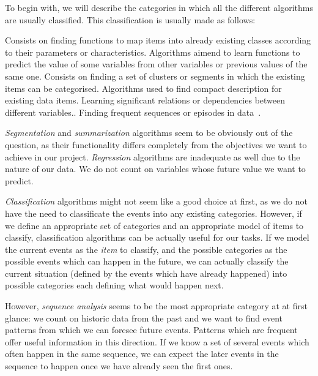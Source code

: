\documentclass[a4paper,12pt]{article}
\begin{document}
To begin with, we will describe the categories in which all the different algorithms are usually classified. This classification is usually made as follows:

\begin{enumerate}
  Consists on finding functions to map items into already existing classes according to their parameters or characteristics.
  Algorithms aimend to learn functions to predict the value of some variables from other variables or previous values of the same one.
  Consists on finding a set of clusters or segments in which the existing items can be categorised.
  Algorithms used to find compact description for existing data items.
  Learning significant relations or dependencies between different variables.\cite{Zhao2003association}.
  Finding frequent sequences or episodes in data~\cite{zhao2003sequential,weiss2002predicting}.
\end{enumerate}

\emph{Segmentation} and \emph{summarization} algorithms seem to be obviously out of the question, as their functionality differs completely from the objectives we want to achieve in our project. \emph{Regression} algorithms are inadequate as well due to the nature of our data. We do not count on variables whose future value we want to predict.

\emph{Classification} algorithms might not seem like a good choice at first, as we do not have the need to classificate the events into any existing categories. However, if we define an appropriate set of categories and an appropriate model of items to classify, classification algorithms can be actually useful for our tasks. If we model the current events as the \emph{item} to classify, and the possible categories as the possible events which can happen in the future, we can actually classify the current situation (defined by the events which have already happened) into possible categories each defining what would happen next.

However, \emph{sequence analysis} seems to be the most appropriate category at at first glance: we count on historic data from the past and we want to find event patterns from which we can foresee future events. Patterns which are frequent offer useful information in this direction. If we know a set of several events which often happen in the same sequence, we can expect the later events in the sequence to happen once we have already seen the first ones.
\end{document}
